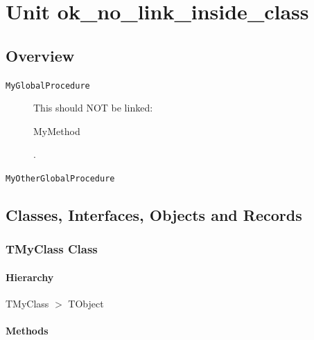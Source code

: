 \documentclass{report}
\newif\ifpdf
\begin{document}
\label{toc}\tableofcontents
\newpage
\newlength{\tmplength}
\chapter{Unit ok{\_}no{\_}link{\_}inside{\_}class}
\label{ok_no_link_inside_class}
\section{Overview}
\begin{description}
\item[\texttt{\begin{ttfamily}TMyClass\end{ttfamily} Class}]
\end{description}
\begin{description}
\item[\texttt{MyGlobalProcedure}]This should NOT be linked: \begin{ttfamily}MyMethod\end{ttfamily}.
\item[\texttt{MyOtherGlobalProcedure}]
\end{description}
\section{Classes, Interfaces, Objects and Records}
\ifpdf
\subsection*{\large{\textbf{TMyClass Class}}\normalsize\hspace{1ex}\hrulefill}
\else
\subsection*{TMyClass Class}
\fi
\label{ok_no_link_inside_class.TMyClass}
\subsubsection*{\large{\textbf{Hierarchy}}\normalsize\hspace{1ex}\hfill}
TMyClass {$>$} TObject
\subsubsection*{\large{\textbf{Methods}}\normalsize\hspace{1ex}\hfill}
\end{document}
